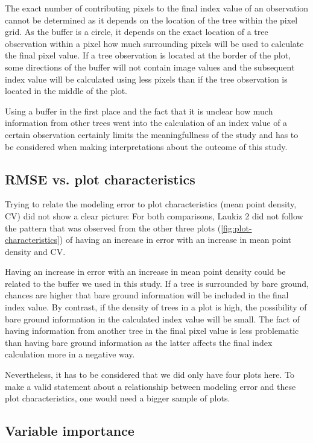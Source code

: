 \documentclass[review]{elsarticle}
\begin{document}
The exact number of contributing pixels to the final index value of an observation cannot be determined as it depends on the location of the tree within the pixel grid.
As the buffer is a circle, it depends on the exact location of a tree observation within a pixel how much surrounding pixels will be used to calculate the final pixel value.
If a tree observation is located at the border of the plot, some directions of the buffer will not contain image values and the subsequent index value will be calculated using less pixels than if the tree observation is located in the middle of the plot.

Using a buffer in the first place and the fact that it is unclear how much information from other trees went into the calculation of an index value of a certain observation certainly limits the meaningfullness of the study and has to be considered when making interpretations about the outcome of this study.

\subsection{RMSE vs. plot characteristics}

Trying to relate the modeling error to plot characteristics (mean point density, CV) did not show a clear picture: For both comparisons, Laukiz 2 did not follow the pattern that was observed from the other three plots (\autoref{fig:plot-characteristics}) of having an increase in error with an increase in mean point density and CV.

Having an increase in error with an increase in mean point density could be related to the buffer we used in this study. 
If a tree is surrounded by bare ground, chances are higher that bare ground information will be included in the final index value. 
By contrast, if the density of trees in a plot is high, the possibility of bare ground information in the calculated index value will be small.
The fact of having information from another tree in the final pixel value is less problematic than having bare ground information as the latter affects the final index calculation more in a negative way.  

Nevertheless, it has to be considered that we did only have four plots here. 
To make a valid statement about a relationship between modeling error and these plot characteristics, one would need a bigger sample of plots.

\subsection{Variable importance}
\end{document}
